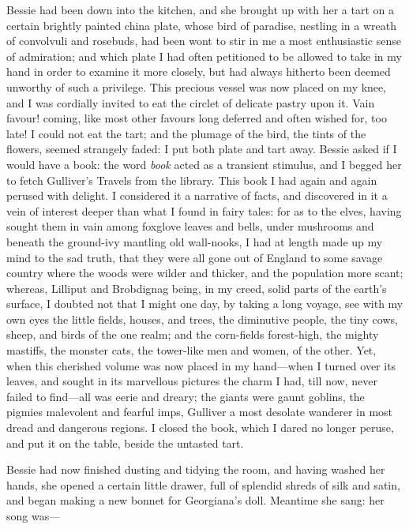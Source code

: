 Bessie had been down into the kitchen, and she brought up with her a
tart on a certain brightly painted china plate, whose bird of paradise,
nestling in a wreath of convolvuli and rosebuds, had been wont to stir
in me a most enthusiastic sense of admiration; and which plate I had
often petitioned to be allowed to take in my hand in order to examine it
more closely, but had always hitherto been deemed unworthy of such a
privilege.  This precious vessel was now placed on my knee, and I was
cordially invited to eat the circlet of delicate pastry upon it.  Vain
favour! coming, like most other favours long deferred and often wished
for, too late!  I could not eat the tart; and the plumage of the bird,
the tints of the flowers, seemed strangely faded: I put both plate and
tart away.  Bessie asked if I would have a book: the word \emph{book}
acted as a transient stimulus, and I begged her to fetch Gulliver's
Travels from the library.  This book I had again and again perused with
delight.  I considered it a narrative of facts, and discovered in it a
vein of interest deeper than what I found in fairy tales: for as to the
elves, having sought them in vain among foxglove leaves and bells, under
mushrooms and beneath the ground-ivy mantling old wall-nooks, I had at
length made up my mind to the sad truth, that they were all gone out of
England to some savage country where the woods were wilder and thicker,
and the population more scant; whereas, Lilliput and Brobdignag being,
in my creed, solid parts of the earth's surface, I doubted not that I
might one day, by taking a long voyage, see with my own eyes the little
fields, houses, and trees, the diminutive people, the tiny cows, sheep,
and birds of the one realm; and the corn-fields forest-high, the mighty
mastiffs, the monster cats, the tower-like men and women, of the other. 
Yet, when this cherished volume was now placed in my hand---when I
turned over its leaves, and sought in its marvellous pictures the charm
I had, till now, never failed to find---all was eerie and dreary; the
giants were gaunt goblins, the pigmies malevolent and fearful imps,
Gulliver a most desolate wanderer in most dread and dangerous regions. 
I closed the book, which I dared no longer peruse, and put it on the
table, beside the untasted tart.

Bessie had now finished dusting and tidying the room, and having washed
her hands, she opened a certain little drawer, full of splendid shreds
of silk and satin, and began making a new bonnet for Georgiana's doll. 
Meantime she sang: her song was---

